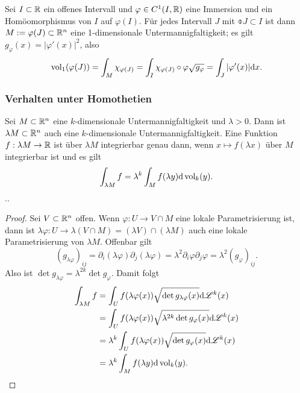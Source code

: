 \begin{exmp}
 Sei $I \subset \mathbb{R}$ ein offenes Intervall und $\varphi \in C^1(I,\mathbb{R})$ eine Immersion und ein Homöomorphismus von $I$ auf $\varphi(I)$. Für jedes Intervall $J$ mit $\obar{J} \subset I$ ist dann $M := \varphi(J) \subset \mathbb{R}^n$ eine 1-dimensionale Untermannigfaltigkeit; es gilt $g_\varphi(x) = |\varphi'(x)|^2$, also
 \[ \operatorname{vol}_1( \varphi(J) ) = \int_M \chi_{\varphi(J)} = \int_I \chi_{\varphi(J)} \circ \varphi \sqrt{ g_\varphi } = \int_J | \varphi'(x) | \mathrm{d} x. \]
\end{exmp}

\clearpage

\subsubsection{Verhalten unter Homothetien}
\begin{thm}
 Sei $M \subset \mathbb{R}^n$ eine $k$-dimensionale Untermannigfaltigkeit und $\lambda > 0$. Dann ist $\lambda M \subset \mathbb{R}^n$ auch eine $k$-dimensionale Untermannigfaltigkeit. Eine Funktion $f: \lambda M \to \mathbb{R}$ ist über $\lambda M$ integrierbar genau dann, wenn $x \mapsto f(\lambda x)$ über $M$ integrierbar ist und es gilt
 \[ \int_{\lambda M} f = \lambda^k \int_M f(\lambda y) \mathrm{d} \operatorname{vol}_k (y). \]
 ..
\end{thm}

\begin{proof}
 Sei $V \subset \mathbb{R}^n$ offen. Wenn $\varphi: U \to V \cap M$ eine lokale Parametrisierung ist, dann ist $\lambda \varphi : U \to \lambda (V \cap M) = (\lambda V) \cap (\lambda M)$ auch eine lokale Parametrisierung von $\lambda M$. Offenbar gilt
 \[ (g_{\lambda \varphi})_{ij} = \partial_i (\lambda \varphi) \partial_j (\lambda \varphi) = \lambda^2 \partial_i \varphi \partial_j \varphi = \lambda^2 (g_\varphi)_{ij}. \]
 Also ist $\det g_{\lambda \varphi} = \lambda^{2k}  \det g_\varphi$. Damit folgt
 \begin{align*}
  \int_{\lambda M} f 
  &= \int_U f(\lambda \varphi(x)) \sqrt{ \det g_{\lambda \varphi}(x) } \mathrm{d} \mathscr{L}^k(x) \\
  &= \int_U f(\lambda \varphi(x)) \sqrt{ \lambda^{2k} \det g_{\varphi}(x) } \mathrm{d} \mathscr{L}^k(x) \\
  &= \lambda^k \int_U f(\lambda \varphi(x)) \sqrt{ \det g_{\varphi}(x) } \mathrm{d} \mathscr{L}^k(x) \\
  &= \lambda^k \int_M f(\lambda y) \mathrm{d} \operatorname{vol}_k(y). \qedhere
 \end{align*}
\end{proof}

